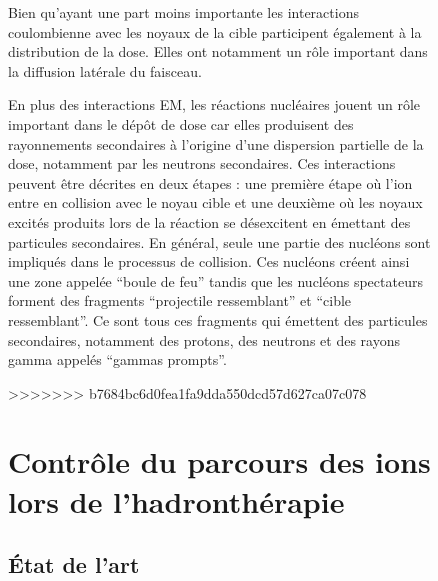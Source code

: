 \documentclass[11pt,a4paper,oldfontcommands]{memoir}
\begin{document}
\begin{figure}
Bien qu'ayant une part moins importante les interactions coulombienne avec les noyaux de la cible participent également à la distribution de la dose. Elles ont notamment un rôle important dans la diffusion latérale du faisceau.

En plus des interactions EM, les réactions nucléaires jouent un rôle important dans le dépôt de dose car elles produisent des rayonnements secondaires à l'origine d'une dispersion partielle de la dose, notamment par les neutrons secondaires. Ces interactions peuvent être décrites en deux étapes : une première étape où l'ion entre en collision avec le noyau cible et une deuxième où les noyaux excités produits lors de la réaction se désexcitent en émettant des particules secondaires. En général, seule une partie des nucléons sont impliqués dans le processus de collision. Ces nucléons créent ainsi une zone appelée \enquote{boule de feu} tandis que les nucléons spectateurs forment des fragments \enquote{projectile ressemblant} et \enquote{cible ressemblant}. Ce sont tous ces fragments qui émettent des particules secondaires, notamment des protons, des neutrons et des rayons gamma appelés \enquote{gammas prompts}. %


>>>>>>> b7684bc6d0fea1fa9dda550dcd57d627ca07c078
\openany
\section{Contrôle du parcours des ions lors de l'hadronthérapie}

\subsection{\'Etat de l'art}


\end{figure}
\end{document}

